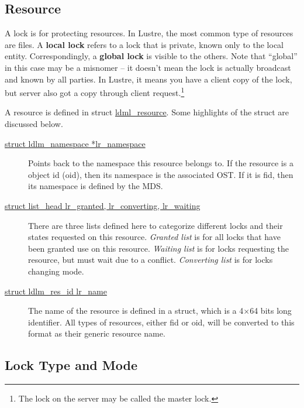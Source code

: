 \subsection{Resource}

A lock is for protecting resources. In Lustre, the most common type of
resources are files. A \textbf{local lock} refers to a lock that is private,
known only to the local entity. Correspondingly, a \textbf{global lock} is
visible to the others.  Note that ``global'' in this case may be a misnomer
-- it doesn't mean the lock is actually broadcast and known by all parties.
In Lustre, it means you have a client copy of the lock, but server also got a
copy through client request.\footnote{The lock on the server may be called 
the master lock.}

A resource is defined in struct \url{ldml_resource}. Some highlights of the
struct are discussed below.

\begin{description}

\item[\url{struct ldlm_namespace *lr_namespace}]

Points back to the namespace this resource belongs to. If the resource
is a object id (oid), then its namespace is the associated OST. If it is fid,
then its namespace is defined by the MDS.

\item[\url{struct list_head lr_granted, lr_converting, lr_waiting}]

There are three lists defined here to categorize different locks and their
states requested on this resource. \textit{Granted list} is for all locks that
have been granted use on this resource. \textit{Waiting list} is for locks
requesting the resource, but must wait due to a conflict.  \textit{Converting
list} is for locks changing mode. 

\item[\url{struct ldlm_res_id lr_name}] 

The name of the resource is defined in a struct, which is a 4$\times$64 bits long
identifier.  All types of resources, either fid or oid, will be converted to
this format as their generic resource name.

\end{description}


\subsection{Lock Type and Mode}

